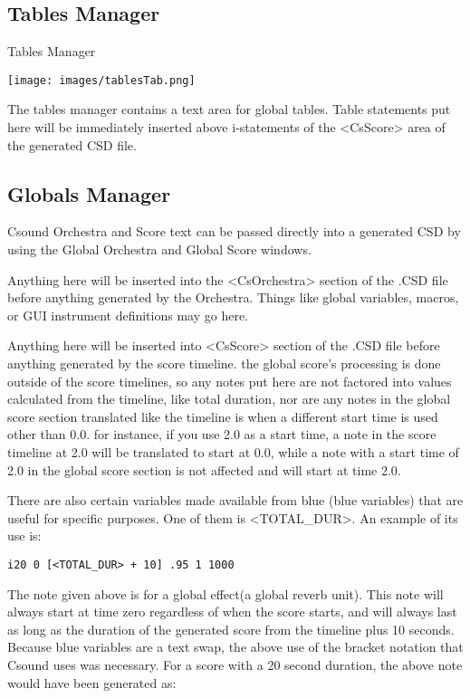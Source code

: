 \subsection{Tables Manager}\label{tablesManager}

Tables Manager

\texttt{[image: images/tablesTab.png]}

The tables manager contains a text area for global tables. Table
statements put here will be immediately inserted above i-statements of
the \textless{}CsScore\textgreater{} area of the generated CSD file.

\subsection{Globals Manager}\label{globalsManager}

Csound Orchestra and Score text can be passed directly into a generated
CSD by using the Global Orchestra and Global Score windows.

Anything here will be inserted into the
\textless{}CsOrchestra\textgreater{} section of the .CSD file before
anything generated by the Orchestra. Things like global variables,
macros, or GUI instrument definitions may go here.

Anything here will be inserted into \textless{}CsScore\textgreater{}
section of the .CSD file before anything generated by the score
timeline. the global score's processing is done outside of the score
timelines, so any notes put here are not factored into values calculated
from the timeline, like total duration, nor are any notes in the global
score section translated like the timeline is when a different start
time is used other than 0.0. for instance, if you use 2.0 as a start
time, a note in the score timeline at 2.0 will be translated to start at
0.0, while a note with a start time of 2.0 in the global score section
is not affected and will start at time 2.0.

There are also certain variables made available from blue (blue
variables) that are useful for specific purposes. One of them is
\textless{}TOTAL\_DUR\textgreater{}. An example of its use is:

\begin{verbatim}
i20 0 [<TOTAL_DUR> + 10] .95 1 1000
\end{verbatim}

The note given above is for a global effect(a global reverb unit). This
note will always start at time zero regardless of when the score starts,
and will always last as long as the duration of the generated score from
the timeline plus 10 seconds. Because blue variables are a text swap,
the above use of the bracket notation that Csound uses was necessary.
For a score with a 20 second duration, the above note would have been
generated as:

